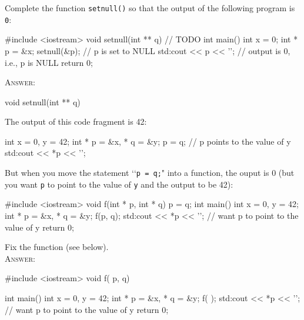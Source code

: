 

\renewcommand\AUTHOR{jdoe5@cougars.ccis.edu} %


\topmattertwo

\nextq
Complete the function \verb!setnull()! so that the output
of the following program is \verb!0!:
\begin{console}[fontsize=\small]
#include <iostream>
void setnull(int ** q)
{
    // TODO
}
int main()
{
    int x = 0;
    int * p = &x;
    setnull(&p);           // p is set to NULL
    std:cout << p << '\n'; // output is 0, i.e., p is NULL
    return 0;
}
\end{console}
\textsc{Answer:}\vspace{-2mm}
\begin{answercode}
void setnull(int ** q)
{
    
}
\end{answercode}

\newpage
\nextq
The output of this code fragment is 42:
\begin{console}[fontsize=\small]
int x = 0, y = 42;
int * p = &x, * q = &y;
p = q;                  // p points to the value of y
std:cout << *p << '\n';
\end{console}
But when you move the statement \lq\lq \verb!p = q;!" into a function,
the ouput is 0 (but you want \verb!p! to point to the value of \verb!y!
and the output to be 42):
\begin{console}[fontsize=\small]
#include <iostream>
void f(int * p, int * q)
{
    p = q;
}
int main()
{
    int x = 0, y = 42;
    int * p = &x, * q = &y;
    f(p, q);
    std:cout << *p << '\n'; // want p to point to the value of y
    return 0;
}
\end{console}
Fix the function (see below).
\\ \textsc{Answer:}\vspace{-2mm}
\begin{answercode}
#include <iostream>
void f(       p,        q)
{

}
int main()
{
    int x = 0, y = 42;
    int * p = &x, * q = &y;
    f(         );
    std:cout << *p << '\n'; // want p to point to the value of y
    return 0;
}
\end{answercode}


\newpage

